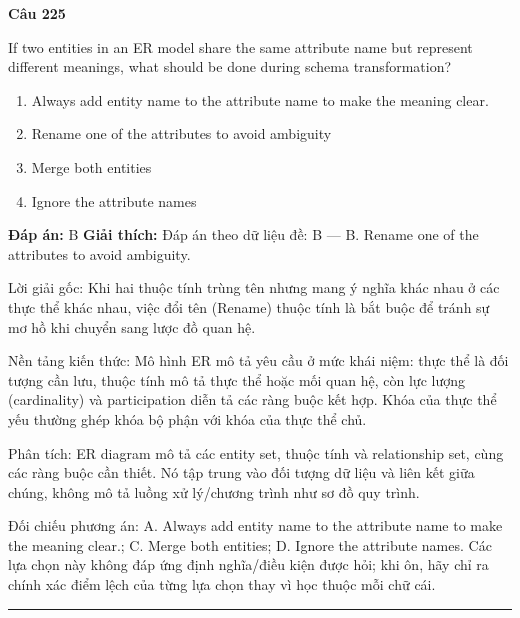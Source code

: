 \documentclass[11pt,a4paper]{article}
\newenvironment{question}[1]{%
  \par\vspace{1em}\noindent\textbf{\large Câu #1}\par\vspace{0.4em}
}{%
  \par\vspace{1em}\hrule\vspace{0.6em}
}
\newenvironment{choices}{%
  \begin{enumerate}[label=\textbf{\Alph*.},leftmargin=2.2em,itemsep=2pt,topsep=3pt]
}{%
  \end{enumerate}
}
\newcommand{\choice}{\item}
\begin{document}
\begin{question}{225}
If two entities in an ER model share the same attribute name but represent different meanings, what should be done during schema transformation?
\begin{choices}
\choice Always add entity name to the attribute name to make the meaning clear.
\choice Rename one of the attributes to avoid ambiguity
\choice Merge both entities
\choice Ignore the attribute names
\end{choices}
\textbf{Đáp án:} B
\textbf{Giải thích:} Đáp án theo dữ liệu đề: B — B. Rename one of the attributes to avoid ambiguity.

Lời giải gốc: Khi hai thuộc tính trùng tên nhưng mang ý nghĩa khác nhau ở các thực thể khác nhau, việc đổi tên (Rename) thuộc tính là bắt buộc để tránh sự mơ hồ khi chuyển sang lược đồ quan hệ.

Nền tảng kiến thức: Mô hình ER mô tả yêu cầu ở mức khái niệm: thực thể là đối tượng cần lưu, thuộc tính mô tả thực thể hoặc mối quan hệ, còn lực lượng (cardinality) và participation diễn tả các ràng buộc kết hợp. Khóa của thực thể yếu thường ghép khóa bộ phận với khóa của thực thể chủ.

Phân tích: ER diagram mô tả các entity set, thuộc tính và relationship set, cùng các ràng buộc cần thiết. Nó tập trung vào đối tượng dữ liệu và liên kết giữa chúng, không mô tả luồng xử lý/chương trình như sơ đồ quy trình.

Đối chiếu phương án: A. Always add entity name to the attribute name to make the meaning clear.; C. Merge both entities; D. Ignore the attribute names. Các lựa chọn này không đáp ứng định nghĩa/điều kiện được hỏi; khi ôn, hãy chỉ ra chính xác điểm lệch của từng lựa chọn thay vì học thuộc mỗi chữ cái.
\end{question}
\end{document}
